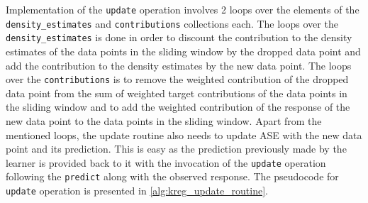 Implementation of the \texttt{update} operation involves 2 loops over the elements of the \texttt{density\_estimates} and \texttt{contributions} collections each. The loops over the \texttt{density\_estimates} is done in order to discount the contribution to the density estimates of the data points in the sliding window by the dropped data point and add the contribution to the density estimates by the new data point. The loops over the \texttt{contributions} is to remove the weighted contribution of the dropped data point from the sum of weighted target contributions of the data points in the sliding window and to add the weighted contribution of the response of the new data point to the data points in the sliding window. Apart from the mentioned loops, the update routine also needs to update ASE with the new data point and its prediction. This is easy as the prediction previously made by the learner is provided back to it with the invocation of the \texttt{update} operation following the \texttt{predict} along with the observed response. The pseudocode for \texttt{update} operation is presented in \ref{alg:kreg_update_routine}.


